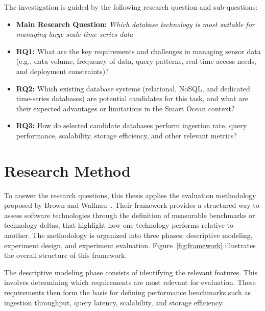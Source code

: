 The investigation is guided by the following research question and
sub-questions:

\begin{itemize}
      \item \textbf{Main Research Question:} \emph{Which database technology is
                  most suitable for managing large-scale time-series data
            }
      \item \textbf{RQ1:} What are the key requirements and challenges in
            managing
            sensor data (e.g., data volume, frequency of
            data, query patterns, real-time access needs, and deployment
            constraints)?
      \item \textbf{RQ2:} Which existing database systems
            (relational, NoSQL, and dedicated time-series databases)
            are potential candidates for this task, and what are their
            expected advantages or limitations in the Smart Ocean context?
      \item \textbf{RQ3:} How do selected candidate databases perform
            ingestion rate, query performance, scalability, storage efficiency,
            and other relevant metrics?
\end{itemize}

\newpage
\section{Research Method}
To answer the research questions, this thesis applies the evaluation
methodology proposed by Brown and Wallnau~\cite{Brown1996}.
Their framework provides a structured way to assess software technologies
through the definition of measurable benchmarks or technology deltas, that
highlight how one technology performs relative to another. The methodology is
organized into three phases: descriptive modeling, experiment design, and
experiment evaluation. Figure~\ref{fig:framework} illustrates the overall
structure of this framework.

The descriptive modeling phase consists of identifying the relevant features.
This involves determining which requirements are most relevant for evaluation.
These requirements then form the basis for defining performance benchmarks such
as ingestion throughput, query latency, scalability, and storage efficiency.

